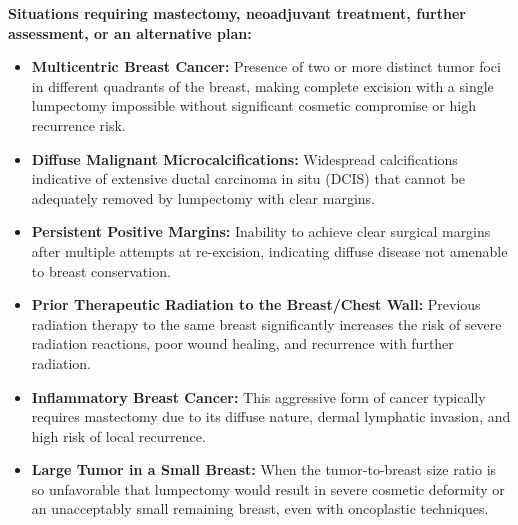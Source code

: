 \textbf{Situations requiring mastectomy, neoadjuvant treatment, further assessment, or an alternative plan:}
\begin{itemize}
  \item \textbf{Multicentric Breast Cancer:} Presence of two or more distinct tumor foci in different quadrants of the breast, making complete excision with a single lumpectomy impossible without significant cosmetic compromise or high recurrence risk.
  
  \item \textbf{Diffuse Malignant Microcalcifications:} Widespread calcifications indicative of extensive ductal carcinoma in situ (DCIS) that cannot be adequately removed by lumpectomy with clear margins.
  
  \item \textbf{Persistent Positive Margins:} Inability to achieve clear surgical margins after multiple attempts at re-excision, indicating diffuse disease not amenable to breast conservation.
  
  \item \textbf{Prior Therapeutic Radiation to the Breast/Chest Wall:} Previous radiation therapy to the same breast significantly increases the risk of severe radiation reactions, poor wound healing, and recurrence with further radiation.
  
  \item \textbf{Inflammatory Breast Cancer:} This aggressive form of cancer typically requires mastectomy due to its diffuse nature, dermal lymphatic invasion, and high risk of local recurrence.
  
  \item \textbf{Large Tumor in a Small Breast:} When the tumor-to-breast size ratio is so unfavorable that lumpectomy would result in severe cosmetic deformity or an unacceptably small remaining breast, even with oncoplastic techniques.
\end{itemize}

